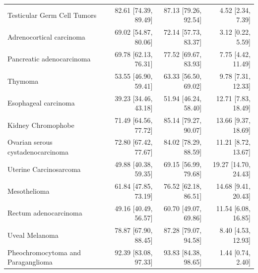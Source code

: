 \begin{tabular}{@{}p{6cm}rrr@{}}
Testicular Germ Cell Tumors & 82.61 [74.39, 89.49] & 87.13 [79.26, 92.54] & 4.52 [2.34, 7.39] \\
Adrenocortical carcinoma & 69.02 [54.87, 80.06] & 72.14 [57.73, 83.37] & 3.12 [0.22, 5.59] \\
Pancreatic adenocarcinoma & 69.78 [62.13, 76.31] & 77.52 [69.67, 83.93] & 7.75 [4.42, 11.49] \\
Thymoma & 53.55 [46.90, 59.41] & 63.33 [56.50, 69.02] & 9.78 [7.31, 12.33] \\
Esophageal carcinoma & 39.23 [34.46, 43.18] & 51.94 [46.24, 58.40] & 12.71 [7.83, 18.49] \\
Kidney Chromophobe & 71.49 [64.56, 77.72] & 85.14 [79.27, 90.07] & 13.66 [9.37, 18.69] \\
Ovarian serous cystadenocarcinoma & 72.80 [67.42, 77.67] & 84.02 [78.29, 88.59] & 11.21 [8.72, 13.67] \\
Uterine Carcinosarcoma & 49.88 [40.38, 59.35] & 69.15 [56.99, 79.68] & 19.27 [14.70, 24.43] \\
Mesothelioma & 61.84 [47.85, 73.19] & 76.52 [62.18, 86.51] & 14.68 [9.41, 20.43] \\
Rectum adenocarcinoma & 49.16 [40.49, 56.57] & 60.70 [49.07, 69.86] & 11.54 [6.08, 16.85] \\
Uveal Melanoma & 78.87 [67.90, 88.45] & 87.28 [79.07, 94.58] & 8.40 [4.53, 12.93] \\
Pheochromocytoma and Paraganglioma & 92.39 [83.08, 97.33] & 93.83 [84.38, 98.65] & 1.44 [0.74, 2.40] \\
\bottomrule
\end{tabular}
